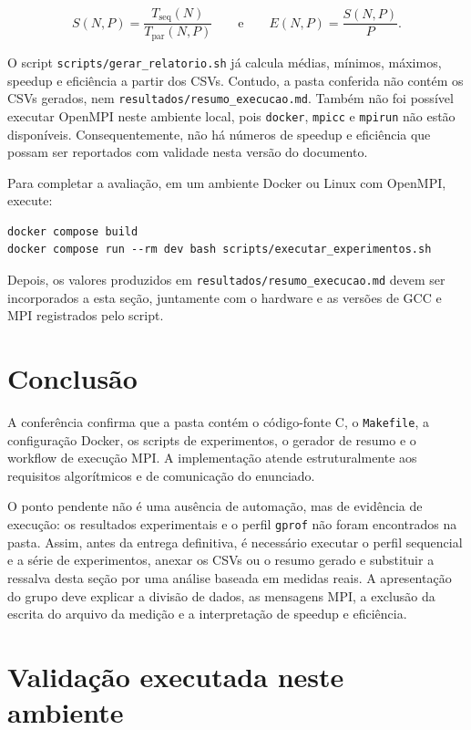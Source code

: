 \documentclass[12pt,a4paper]{article}
\begin{document}
\[
  S(N,P)=\frac{T_{\mathrm{seq}}(N)}{T_{\mathrm{par}}(N,P)}
  \qquad\text{e}\qquad
  E(N,P)=\frac{S(N,P)}{P}.
\]

O script \texttt{scripts/gerar\_relatorio.sh} já calcula médias, mínimos,
máximos, speedup e eficiência a partir dos CSVs. Contudo, a pasta conferida
não contém os CSVs gerados, nem \texttt{resultados/resumo\_execucao.md}.
Também não foi possível executar OpenMPI neste ambiente local, pois
\texttt{docker}, \texttt{mpicc} e \texttt{mpirun} não estão disponíveis.
Consequentemente, não há números de speedup e eficiência que possam ser
reportados com validade nesta versão do documento.

Para completar a avaliação, em um ambiente Docker ou Linux com OpenMPI,
execute:

\begin{lstlisting}
docker compose build
docker compose run --rm dev bash scripts/executar_experimentos.sh
\end{lstlisting}

Depois, os valores produzidos em \texttt{resultados/resumo\_execucao.md}
devem ser incorporados a esta seção, juntamente com o hardware e as versões
de GCC e MPI registrados pelo script.

\section{Conclusão}

A conferência confirma que a pasta contém o código-fonte C, o \texttt{Makefile},
a configuração Docker, os scripts de experimentos, o gerador de resumo e o
workflow de execução MPI. A implementação atende estruturalmente aos
requisitos algorítmicos e de comunicação do enunciado.

O ponto pendente não é uma ausência de automação, mas de evidência de
execução: os resultados experimentais e o perfil \texttt{gprof} não foram
encontrados na pasta. Assim, antes da entrega definitiva, é necessário
executar o perfil sequencial e a série de experimentos, anexar os CSVs ou o
resumo gerado e substituir a ressalva desta seção por uma análise baseada em
medidas reais. A apresentação do grupo deve explicar a divisão de dados, as
mensagens MPI, a exclusão da escrita do arquivo da medição e a interpretação
de speedup e eficiência.

\section{Validação executada neste ambiente}
\end{document}
